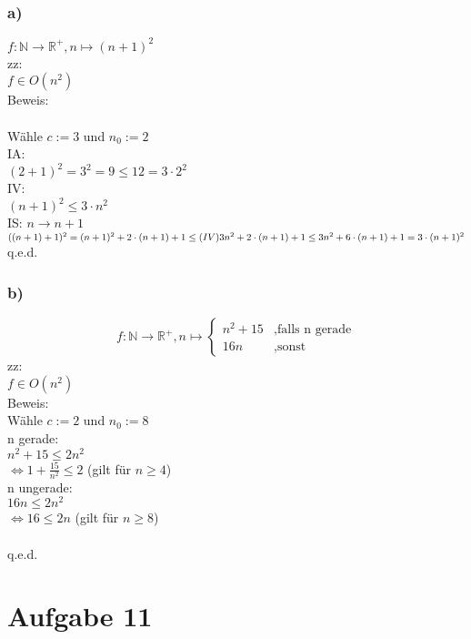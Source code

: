 \documentclass[12pt,ngerman]{article}
\theoremstyle{definition}
\begin{document}
\section*{a)}

$f: \mathbb{N} \to \mathbb{R}^+, n \mapsto (n + 1)^2$\\
zz:\\
$f \in O(n^2)$\\
Beweis:\\\\
Wähle $c := 3$ und $n_0 := 2$\\
IA:\\
$(2 + 1)^2 = 3^2 = 9 \leq 12 = 3 \cdot 2^2$\\
IV:\\
$(n + 1)^2 \leq 3 \cdot n^2$\\
IS: $n \to n + 1$\\
$((n + 1) + 1)^2 =\\ (n + 1)^2 + 2 \cdot (n + 1) + 1 \leq (IV)\\ 3n^2 + 2 \cdot (n + 1) + 1 \leq\\ 3n^2 + 6 \cdot (n + 1) + 1 =\\ 3 \cdot (n + 1)^2$\\
q.e.d.
\section*{b)}
\begin{equation}
f: \mathbb{N} \to \mathbb{R}^+, n \mapsto
\left\{
  \begin{array}{ll}
    n^2 + 15  & , \mbox{falls n gerade} \\
    16n & , \mbox{sonst}
  \end{array}
\right.
\end{equation}
zz:\\
$f \in O(n^2)$\\
Beweis:\\
Wähle $c := 2$ und $n_0 := 8$\\
n gerade:\\
$n^2 + 15 \leq 2 n^2$\\
$\Leftrightarrow 1 + \frac{15}{n^2} \leq 2$ (gilt für $n \geq 4$)\\
n ungerade:\\
$16n \leq 2 n^2$\\
$\Leftrightarrow 16 \leq 2n$ (gilt für $n \geq 8$)\\\\
q.e.d.

\part*{Aufgabe 11}
\end{document}
